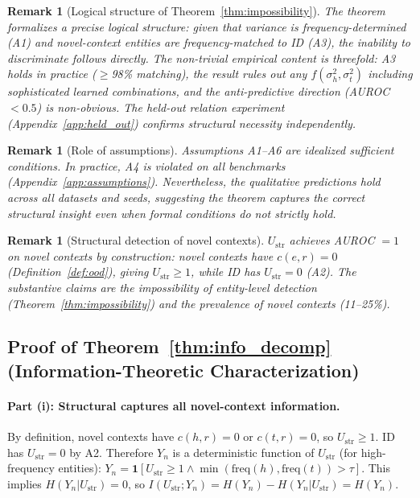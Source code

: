 \documentclass{article}
\newtheorem{remark}[theorem]{Remark}
\begin{document}
\begin{remark}[Logical structure of Theorem~\ref{thm:impossibility}]
\label{rem:theorem_structure}
The theorem formalizes a precise logical structure: given that variance is frequency-determined (A1) and novel-context entities are frequency-matched to ID (A3), the inability to discriminate follows directly. The non-trivial empirical content is threefold: A3 holds in practice ($\geq$98\% matching), the result rules out \emph{any} $f(\sigma^2_h, \sigma^2_t)$ including sophisticated learned combinations, and the anti-predictive direction (AUROC $< 0.5$) is non-obvious. The held-out relation experiment (Appendix~\ref{app:held_out}) confirms structural necessity independently.
\end{remark}

\begin{remark}[Role of assumptions]
\label{rem:assumptions}
Assumptions A1--A6 are idealized sufficient conditions. In practice, A4 is violated on all benchmarks (Appendix~\ref{app:assumptions}). Nevertheless, the qualitative predictions hold across all datasets and seeds, suggesting the theorem captures the correct structural insight even when formal conditions do not strictly hold.
\end{remark}

\begin{remark}[Structural detection of novel contexts]
\label{rem:novel_perfect}
$U_{\text{str}}$ achieves AUROC $= 1$ on novel contexts by construction: novel contexts have $c(e,r)=0$ (Definition~\ref{def:ood}), giving $U_{\text{str}} \geq 1$, while ID has $U_{\text{str}} = 0$ (A2). The substantive claims are the \emph{impossibility} of entity-level detection (Theorem~\ref{thm:impossibility}) and the \emph{prevalence} of novel contexts (11--25\%).
\end{remark}

\subsection{Proof of Theorem~\ref{thm:info_decomp} (Information-Theoretic Characterization)}
\label{app:info_proof}

\paragraph{Part (i): Structural captures all novel-context information.}
By definition, novel contexts have $c(h,r) = 0$ or $c(t,r) = 0$, so $U_{\text{str}} \geq 1$. ID has $U_{\text{str}} = 0$ by A2. Therefore $Y_n$ is a deterministic function of $U_{\text{str}}$ (for high-frequency entities): $Y_n = \mathbf{1}[U_{\text{str}} \geq 1 \land \min(\text{freq}(h), \text{freq}(t)) > \tau]$. This implies $H(Y_n | U_{\text{str}}) = 0$, so $I(U_{\text{str}}; Y_n) = H(Y_n) - H(Y_n | U_{\text{str}}) = H(Y_n)$.
\end{document}
